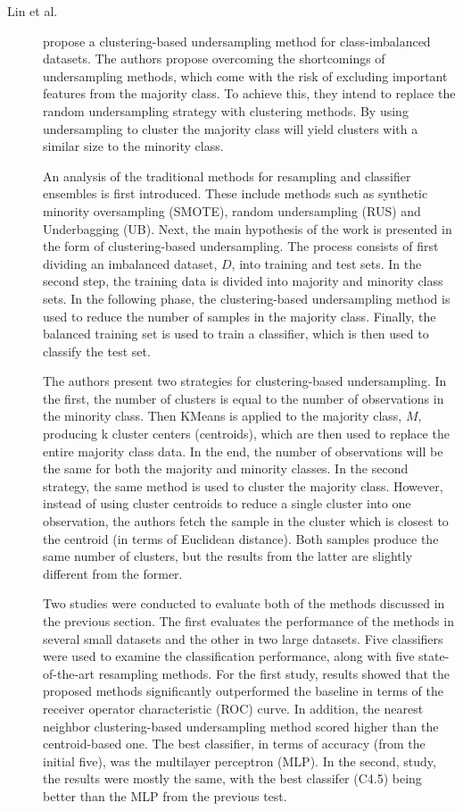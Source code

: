 \begin{description}
    \item[Lin et al.]\cite{Lin.Tsai.ea_Clusteringbasedundersamplingclassimbalanced_2017}  propose a clustering-based undersampling method for class-imbalanced datasets. The authors propose overcoming the shortcomings of undersampling methods, which come with the risk of excluding important features from the majority class. To achieve this, they intend to replace the random undersampling strategy with clustering methods. By using undersampling to cluster the majority class will yield clusters with a similar size to the minority class. 
    
    An analysis of the traditional methods for resampling and classifier ensembles is first introduced. These include methods such as synthetic minority oversampling (SMOTE), random undersampling (RUS) and Underbagging (UB). Next, the main hypothesis of the work is presented in the form of clustering-based undersampling. The process consists of first dividing an imbalanced dataset, $D$, into training and test sets. In the second step, the training data is divided into majority and minority class sets. In the following phase, the clustering-based undersampling method is used to reduce the number of samples in the majority class. Finally, the balanced training set is used to train a classifier, which is then used to classify the test set. 

    The authors present two strategies for clustering-based undersampling. In the first, the number of clusters is equal to the number of observations in the minority class. Then KMeans is applied to the majority class, $M$, producing k cluster centers (centroids), which are then used to replace the entire majority class data. In the end, the number of observations will be the same for both the majority and minority classes. In the second strategy, the same method is used to cluster the majority class. However, instead of using cluster centroids to reduce a single cluster into one observation, the authors fetch the sample in the cluster which is closest to the centroid (in terms of Euclidean distance). Both samples produce the same number of clusters, but the results from the latter are slightly different from the former.

    Two studies were conducted to evaluate both of the methods discussed in the previous section. The first evaluates the performance of the methods in several small datasets and the other in two large datasets. Five classifiers were used to examine the classification performance, along with five state-of-the-art resampling methods. For the first study, results showed that the proposed methods significantly outperformed the baseline in terms of the receiver operator characteristic (ROC) curve. In addition, the nearest neighbor clustering-based undersampling method scored higher than the centroid-based one. The best classifier, in terms of accuracy (from the initial five), was the multilayer perceptron (MLP). In the second, study, the results were mostly the same, with the best classifer (C4.5) being better than the MLP from the previous test.


\end{description}
